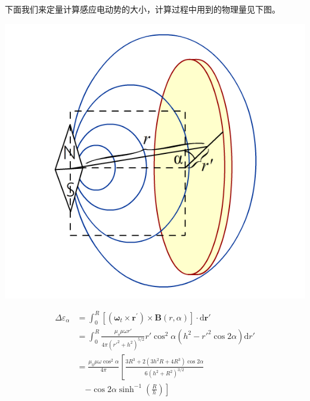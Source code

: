 \documentclass{CLGPY}
\begin{document}
\begin{multicols}{1}
下面我们来定量计算感应电动势的大小，计算过程中用到的物理量见下图。
        \begin{center}
            \includegraphics[scale=.28]{./fig/20210614152326.png}
        \end{center}
\begin{equation}
\begin{aligned}
\Delta \varepsilon_{\alpha}&=\int_{0}^{R}\left[\left(\boldsymbol{\omega}_{t} \times \bm{r^{\prime}}\right) \times \boldsymbol{B}(r, \alpha)\right] \cdot \mathrm{d} \boldsymbol{r'}\\
&=\int_0^R\frac{\mu_o\mu\omega r'}{4\pi(r'^2+h^2)^{5/2}}r'\cos^2\alpha(h^2-r'^2\cos2\alpha)\text{d}r'\\
&=\frac{\mu_0\mu\omega\cos^2\alpha}{4\pi}\left[\frac{3R^3+2(3h^2R+4R^3)\cos2\alpha}{6(h^2+R^2)^{3/2}}\right.\\&\text{　}\left.-\cos2\alpha\sinh^{-1}\left(\frac{R}{h}\right)\right]
\end{aligned}
\end{equation}


\end{multicols}
\end{document}
